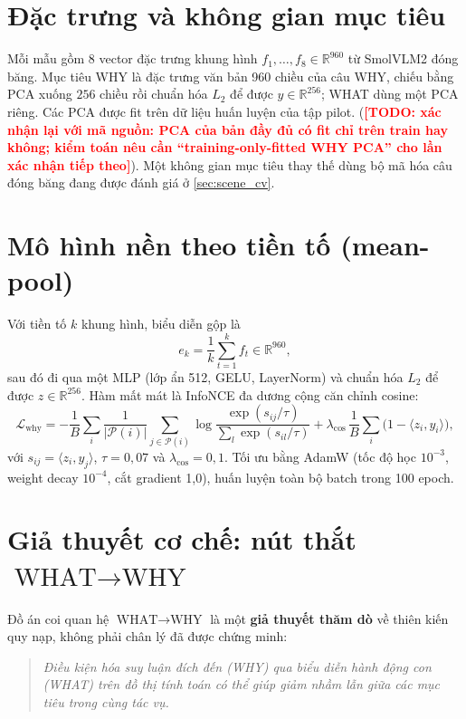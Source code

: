 \documentclass[12pt,a4paper]{report}
\newcommand{\TODO}[1]{\textcolor{red}{\textbf{[TODO: #1]}}}
\begin{document}
\section{Đặc trưng và không gian mục tiêu}

Mỗi mẫu gồm 8 vector đặc trưng khung hình $f_1,\dots,f_8 \in \mathbb{R}^{960}$ từ SmolVLM2 đóng băng. Mục tiêu WHY là đặc trưng văn bản 960 chiều của câu WHY, chiếu bằng PCA xuống $256$ chiều rồi chuẩn hóa $L_2$ để được $y \in \mathbb{R}^{256}$; WHAT dùng một PCA riêng. Các PCA được fit trên dữ liệu huấn luyện của tập pilot. (\TODO{xác nhận lại với mã nguồn: PCA của bản đầy đủ có fit chỉ trên train hay không; kiểm toán nêu cần ``training-only-fitted WHY PCA'' cho lần xác nhận tiếp theo}). Một không gian mục tiêu thay thế dùng bộ mã hóa câu đóng băng \citep{reimers2019sbert} đang được đánh giá ở \cref{sec:scene_cv}.

\section{Mô hình nền theo tiền tố (mean-pool)}
\label{sec:meanpool}

Với tiền tố $k$ khung hình, biểu diễn gộp là
\begin{equation}
    e_k = \frac{1}{k}\sum_{t=1}^{k} f_t \in \mathbb{R}^{960},
\end{equation}
sau đó đi qua một MLP (lớp ẩn 512, GELU, LayerNorm) và chuẩn hóa $L_2$ để được $z \in \mathbb{R}^{256}$. Hàm mất mát là InfoNCE đa dương cộng căn chỉnh cosine:
\begin{equation}
    \mathcal{L}_{\mathrm{why}} = -\frac{1}{B}\sum_{i}\frac{1}{|\mathcal{P}(i)|}\sum_{j\in\mathcal{P}(i)}\log\frac{\exp(s_{ij}/\tau)}{\sum_{l}\exp(s_{il}/\tau)} + \lambda_{\cos}\,\frac{1}{B}\sum_i \bigl(1-\langle z_i,y_i\rangle\bigr),
\end{equation}
với $s_{ij}=\langle z_i,y_j\rangle$, $\tau=0{,}07$ và $\lambda_{\cos}=0{,}1$. Tối ưu bằng AdamW (tốc độ học $10^{-3}$, weight decay $10^{-4}$, cắt gradient 1,0), huấn luyện toàn bộ batch trong 100 epoch.

\section{\texorpdfstring{Giả thuyết cơ chế: nút thắt $\text{WHAT}\to\text{WHY}$}{Giả thuyết cơ chế: nút thắt WHAT -> WHY}}

Đồ án coi quan hệ $\text{WHAT}\to\text{WHY}$ là một \textbf{giả thuyết thăm dò} về thiên kiến quy nạp, không phải chân lý đã được chứng minh:
\begin{quote}
\textit{Điều kiện hóa suy luận đích đến (WHY) qua biểu diễn hành động con (WHAT) trên đồ thị tính toán có thể giúp giảm nhầm lẫn giữa các mục tiêu trong cùng tác vụ.}
\end{quote}
\end{document}
